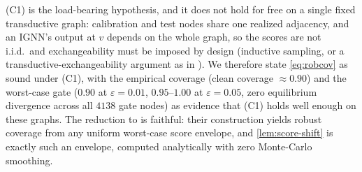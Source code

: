 \begin{remark}
\label{rem:exchange-honesty}
(C1) is the load-bearing hypothesis, and it does not hold for free on a single fixed transductive graph:
calibration and test nodes share one realized adjacency, and an IGNN's output at $v$ depends on the
whole graph, so the scores are not i.i.d.\ and exchangeability must be imposed by design (inductive
sampling, or a transductive-exchangeability argument as in \citealp{zargarbashi2023conformal}). We
therefore state \eqref{eq:robcov} as sound under (C1), with the empirical coverage (clean coverage
$\approx0.90$) and the worst-case gate ($0.90$ at $\varepsilon=0.01$, $0.95$--$1.00$ at
$\varepsilon=0.05$, zero equilibrium divergence across all $4138$ gate nodes) as evidence that (C1)
holds well enough on these graphs. The reduction to \citet{zargarbashi2023conformal} is faithful: their
construction yields robust coverage from any uniform worst-case score envelope, and
\cref{lem:score-shift} is exactly such an envelope, computed analytically with zero Monte-Carlo
smoothing.
\end{remark}
